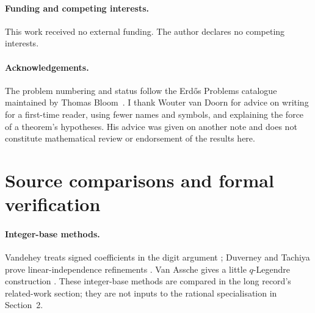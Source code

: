 \documentclass[11pt]{article}
\begin{document}
\paragraph{Funding and competing interests.} This work received no external
funding.  The author declares no competing interests.

\paragraph{Acknowledgements.} The problem numbering and status follow the
Erd\H{o}s Problems catalogue maintained by Thomas Bloom~\cite{erdosproblems}.
I thank Wouter van Doorn for advice on writing for a first-time reader,
using fewer names and symbols, and explaining the force of a theorem's
hypotheses. His advice was given on another note and does not constitute
mathematical review or endorsement of the results here.


\appendix
\section{Source comparisons and formal verification}\label{app:index}

\paragraph{Integer-base methods.}
Vandehey treats signed coefficients in the digit argument
\cite[Thms.~1.1--1.2, p.~2]{vandehey2013}; Duverney and Tachiya prove
linear-independence refinements
\cite[Thms.~1.1--1.2 and Cor.~1.1, pp.~2--3]{duverneytachiya2019}.
Van Assche gives a little $q$-Legendre construction
\cite[(4), (9), (16), pp.~3--4]{vanassche2001}.
These integer-base methods are compared in the long record's related-work
section; they are not inputs to the rational specialisation in Section~2.
\end{document}
